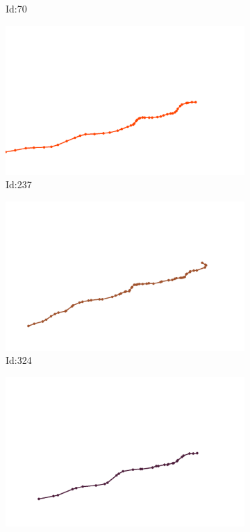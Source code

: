 \documentclass[12pt,twoside]{report}
\begin{document}
\begin{figure}
\begin{subfigure}[b]{0.20\textwidth}
\caption{Id:70}
\end{subfigure}
\begin{subfigure}[b]{0.20\textwidth}
\centering
\includegraphics[width=\textwidth]{../../trajectories/237.png}
\caption{Id:237}
\end{subfigure}
\begin{subfigure}[b]{0.20\textwidth}
\centering
\includegraphics[width=\textwidth]{../../trajectories/324.png}
\caption{Id:324}
\end{subfigure}
\begin{subfigure}[b]{0.20\textwidth}
\centering
\includegraphics[width=\textwidth]{../../trajectories/358.png}

\end{subfigure}
\end{figure}
\end{document}

